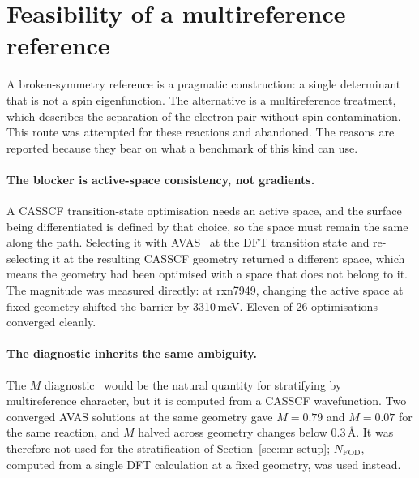 
\section{Feasibility of a multireference reference}
\label{sec:mr-whynotmr}

A broken-symmetry reference is a pragmatic construction: a single determinant
that is not a spin eigenfunction. The alternative is a multireference treatment,
which describes the separation of the electron pair without spin contamination.
This route was attempted for these reactions and abandoned. The reasons are
reported because they bear on what a benchmark of this kind can use.

\paragraph{The blocker is active-space consistency, not gradients.} A CASSCF
transition-state optimisation needs an active space, and the surface being
differentiated is defined by that choice, so the space must remain the same
along the path. Selecting it with AVAS~\cite{sayfutyarova2017} at the DFT
transition state and re-selecting it at the resulting CASSCF geometry returned a
different space, which means the geometry had been optimised with a space that
does not belong to it. The magnitude was measured directly: at rxn7949, changing
the active space at fixed geometry shifted the barrier by 3310\,meV. Eleven of
26 optimisations converged cleanly.

\paragraph{The diagnostic inherits the same ambiguity.} The $M$
diagnostic~\cite{tishchenko2008} would be the natural quantity for stratifying
by multireference character, but it is computed from a CASSCF wavefunction. Two
converged AVAS solutions at the same geometry gave $M = 0.79$ and $M = 0.07$ for
the same reaction, and $M$ halved across geometry changes below 0.3\,\AA. It was
therefore not used for the stratification of Section~\ref{sec:mr-setup};
$N_\mathrm{FOD}$, computed from a single DFT calculation at a fixed geometry,
was used instead.

